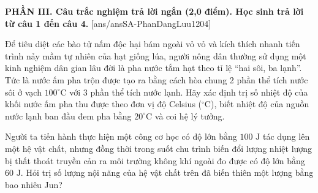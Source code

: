 
\noindent \textbf{PHẦN III. Câu trắc nghiệm trả lời ngắn (2,0 điểm). Học sinh trả lời từ câu 1 đến câu 4.}
[ans/ansSA-PhanDangLuu1204]

\begin{ex}%
	Để tiêu diệt các bào tử nấm độc hại bám ngoài vỏ vỏ và kích thích nhanh tiến trình nảy mầm tự nhiên của hạt giống lúa, người nông dân thường sử dụng một kinh nghiệm dân gian lâu đời là pha nước tắm hạt theo tỉ lệ “hai sôi, ba lạnh”. Tức là nước ấm pha trộn được tạo ra bằng cách hòa chung 2 phần thể tích nước sôi ở vạch $100^\circ\text{C}$ với 3 phần thể tích nước lạnh. Hãy xác định trị số nhiệt độ của khối nước ấm pha thu được theo đơn vị độ Celsius ($^\circ\text{C}$), biết nhiệt độ của nguồn nước lạnh ban đầu đem pha bằng $20^\circ\text{C}$ và coi hệ lý tưởng.
\end{ex}

\begin{ex}%
	Người ta tiến hành thực hiện một công cơ học có độ lớn bằng $100\text{ J}$ tác dụng lên một hệ vật chất, nhưng đồng thời trong suốt chu trình biến đổi lượng nhiệt lượng bị thất thoát truyền cản ra môi trường không khí ngoài đo được có độ lớn bằng $60\text{ J}$. Hỏi trị số lượng nội năng của hệ vật chất trên đã biến thiên một lượng bằng bao nhiêu Jun?
\end{ex}

